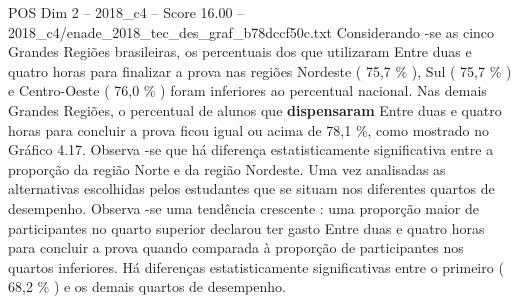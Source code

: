 \begin{textsample}{POS Dim 2 – 2018\_c4 – Score 16.00 – 2018\_c4/enade\_2018\_tec\_des\_graf\_b78dccf50c.txt}
Considerando -se as cinco Grandes Regiões brasileiras, os percentuais dos que utilizaram Entre duas e quatro horas para finalizar a prova nas regiões Nordeste ( 75,7 \% ), Sul ( 75,7 \% ) e Centro-Oeste ( 76,0 \% ) foram inferiores ao percentual nacional.
Nas demais Grandes Regiões, o percentual de alunos que \textbf{dispensaram} Entre duas e quatro horas para concluir a prova ficou igual ou acima de 78,1 \%, como mostrado no Gráfico 4.17.
Observa -se que há diferença estatisticamente significativa entre a proporção da região Norte e da região Nordeste.
Uma vez analisadas as alternativas escolhidas pelos estudantes que se situam nos diferentes quartos de desempenho.
Observa -se uma tendência crescente : uma proporção maior de participantes no quarto superior declarou ter gasto Entre duas e quatro horas para concluir a prova quando comparada à proporção de participantes nos quartos inferiores.
Há diferenças estatisticamente significativas entre o primeiro ( 68,2 \% ) e os demais quartos de desempenho.

\end{textsample}
